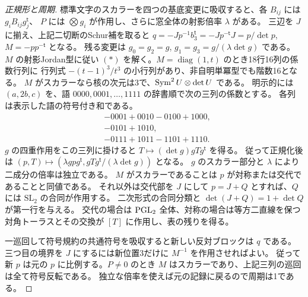 \begin{proof}[正規形と周期]
標準文字のスカラーを四つの基底変更に吸収すると、各 $B_{ij}$ には $g_i B_{ij}g_j^{\mathsf t}$、
$P$ には $\bigotimes g_i$ が作用し、さらに窓全体の射影倍率 $\lambda$ がある。
三辺を $J$ に揃え、上記二切断のSchur補を取ると
$q=-Jp^{-1}b_3^{\mathsf t}=-Jp^{-\mathsf t}J=p/\det p$, $M=-pp^{-\mathsf t}$ となる。
残る変更は $g_0=g_2=g$, $g_1=g_3=g/(\lambda\det g)$ である。
$M$ の射影Jordan型に従い $(*)$ を解く。$M=\operatorname{diag}(1,t)$ のとき18行16列の係数行列に
行列式 $-(t-1)^3/t^3$ の小行列があり、非自明単冪型でも階数16となる。
$M$ がスカラーなら核の次元は3で、$\operatorname{Sym}^2 U\otimes\det U$ である。
明示的には $(a,2b,c)$ を、語 $0000,0001,\ldots,1111$ の辞書順で次の三列の係数とする。
各列は表示した語の符号付き和である。
\[
 \begin{aligned}
 &-0001+0010-0100+1000,\\
 &-0101+1010,\\
 &-0111+1011-1101+1110.
 \end{aligned}
\]
$g$ の四重作用をこの三列に掛けると $T\mapsto(\det g)gTg^{\mathsf t}$ を得る。
従って正規化後は $(p,T)\mapsto(\lambda gpg^{\mathsf t},gTg^{\mathsf t}/(\lambda\det g))$ となる。
$g$ のスカラー部分と $\lambda$ により二成分の倍率は独立である。
$M$ がスカラーであることは $p$ が対称または交代であることと同値である。
それ以外は交代部を $J$ にして $p=J+Q$ とすれば、$Q$ には $\mathrm{SL}_2$ の合同が作用する。
二次形式の合同分類と $\det(J+Q)=1+\det Q$ が第一行を与える。
交代の場合は $\operatorname{PGL}_2$ 全体、対称の場合は等方二直線を保つ対角トーラスとその交換が $[T]$ に作用し、表の残りを得る。

一巡回して符号規約の共通符号を吸収すると新しい反対ブロックは $q$ である。
三つ目の境界を $J$ にするには新位置3だけに $M^{-1}$ を作用させればよい。
従って新 $p$ は元の $p$ に比例する。$P\ne0$ のとき $M$ はスカラーであり、上記三列の巡回は全て符号反転である。
独立な倍率を使えば元の記録に戻るので周期は1である。
\end{proof}

